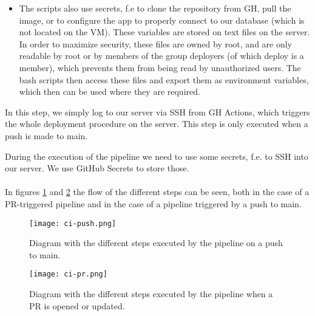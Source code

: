 \begin{enumerate}
\begin{itemize}
		\item The scripts also use secrets, f.e to clone the repository from GH, pull the image, or to configure the app to properly connect to our database (which is not located on the VM). These variables are stored on text files on the server. In order to maximize security, these files are owned by root, and are only readable by root or by members of the group deployers (of which deploy is a member), which prevents them from being read by unauthorized users. The bash scripts then access these files and export them as environment variables, which then can be used where they are required.
	\end{itemize}
	In this step, we simply log to our server via SSH from GH Actions, which triggers the whole deployment procedure on the server. This step is only executed when a push is made to main. 
\end{enumerate}
During the execution of the pipeline we need to use some secrets, f.e. to SSH into our server. We use GitHub Secrets to store those.

\paragraph{} In figures \ref{fig:ci-push} and \ref{fig:ci-pr} the flow of the different steps can be seen, both in the case of a PR-triggered pipeline and in the case of a pipeline triggered by a push to main.

\begin{figure}[H]
	\centering
	\texttt{[image: ci-push.png]}
	\caption{Diagram with the different steps executed by the pipeline on a push to main.}
	\label{fig:ci-push}
\end{figure}

\begin{figure}[H]
	\centering
	\texttt{[image: ci-pr.png]}
	\caption{Diagram with the different steps executed by the pipeline when a PR is opened or updated.}
	\label{fig:ci-pr}
\end{figure}